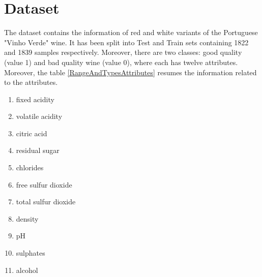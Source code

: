 \documentclass[twoside,a4paper,12pt]{report}
\begin{document}
\tableofcontents

\newpage


\setcounter{chapter}{1}


\section{Dataset}

The dataset contains the information of red and white variants of the Portuguese "Vinho Verde" wine. 
It has been split into Test and Train sets containing 1822 and 1839 samples respectively. 
Moreover, there are two classes: good quality (value 1) and bad quality wine (value 0), 
where each has twelve attributes. Moreover, the table \ref{RangeAndTypesAttributes} 
resumes the information related to the attributes.

\begin{enumerate}
    \item fixed acidity
    \item volatile acidity
    \item citric acid
    \item residual sugar
    \item chlorides
    \item free sulfur dioxide
    \item total sulfur dioxide
    \item density
    \item pH
    \item sulphates
    \item alcohol
\end{enumerate}
\end{document}
